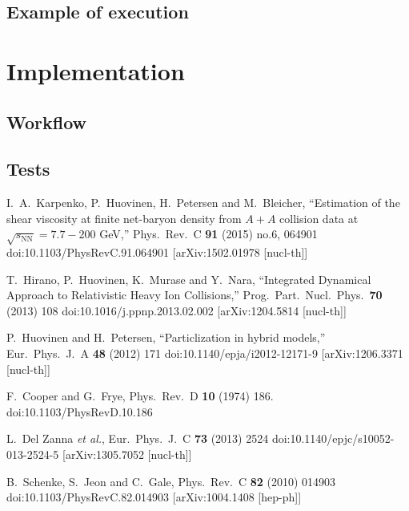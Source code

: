 \documentclass[12pt, a4paper]{report}
\begin{document}
\section{Example of execution}


\chapter{Implementation}
\section{Workflow}
\section{Tests}

\begin{thebibliography}{20}
	I.~A.~Karpenko, P.~Huovinen, H.~Petersen and M.~Bleicher,
	``Estimation of the shear viscosity at finite net-baryon density from $A+A$ collision data at $\sqrt{s_\mathrm{NN}} = 7.7-200$ GeV,''
	Phys.\ Rev.\ C {\bf 91} (2015) no.6,  064901
	doi:10.1103/PhysRevC.91.064901
	[arXiv:1502.01978 [nucl-th]]
	
	T.~Hirano, P.~Huovinen, K.~Murase and Y.~Nara,
	``Integrated Dynamical Approach to Relativistic Heavy Ion Collisions,''
	Prog.\ Part.\ Nucl.\ Phys.\  {\bf 70} (2013) 108
	doi:10.1016/j.ppnp.2013.02.002
	[arXiv:1204.5814 [nucl-th]]
	
	P.~Huovinen and H.~Petersen,
	``Particlization in hybrid models,''
	Eur.\ Phys.\ J.\ A {\bf 48} (2012) 171
	doi:10.1140/epja/i2012-12171-9
	[arXiv:1206.3371 [nucl-th]]
	
	F.~Cooper and G.~Frye,
	Phys.\ Rev.\ D {\bf 10} (1974) 186.
	doi:10.1103/PhysRevD.10.186
	
	L.~Del Zanna {\it et al.},
	Eur.\ Phys.\ J.\ C {\bf 73} (2013) 2524
	doi:10.1140/epjc/s10052-013-2524-5
	[arXiv:1305.7052 [nucl-th]]
	
	B.~Schenke, S.~Jeon and C.~Gale,
	Phys.\ Rev.\ C {\bf 82} (2010) 014903
	doi:10.1103/PhysRevC.82.014903
	[arXiv:1004.1408 [hep-ph]]
	

\end{thebibliography}
\end{document}
